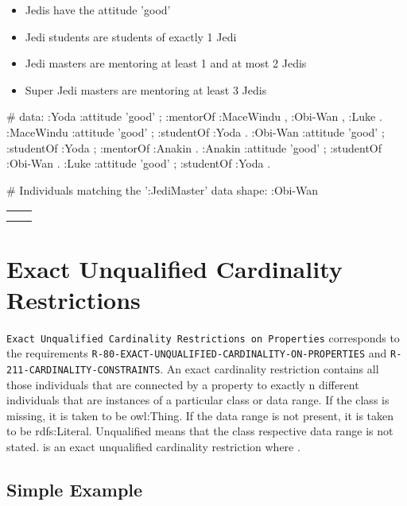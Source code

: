\documentclass{llncs}
\newcommand{\ms}[1]{\texttt{#1}}
\newenvironment{DL}{
\vspace{0cm}
	\begin{center}
  \begin{tabular}{r l}

}{
  \end{tabular}
	\end{center}
}
\begin{document}
\begin{itemize}
	\item Jedis have the attitude 'good'
	\item Jedi students are students of exactly 1 Jedi
	\item Jedi masters are mentoring at least 1 and at most 2 Jedis
	\item Super Jedi masters are mentoring at least 3 Jedis
\end{itemize}

\begin{ex}
# data:
:Yoda 
    :attitude 'good' ;
    :mentorOf :MaceWindu , :Obi-Wan , :Luke .
:MaceWindu
    :attitude 'good' ;
    :studentOf :Yoda .
:Obi-Wan 
    :attitude 'good' ;
    :studentOf :Yoda ;
    :mentorOf :Anakin .
:Anakin
    :attitude 'good' ; 
    :studentOf :Obi-Wan .
:Luke
    :attitude 'good' ;
    :studentOf :Yoda .
\end{ex}

\begin{ex}
# Individuals matching the ’:JediMaster’ data shape:
:Obi-Wan
\end{ex}


\begin{DL}
\\
 \\
\\

\end{DL}

\section{Exact Unqualified Cardinality Restrictions}

\ms{Exact Unqualified Cardinality Restrictions on Properties} corresponds to the requirements
\ms{R-80-EXACT-UNQUALIFIED-CARDINALITY-ON-PROPERTIES} and
\ms{R-211-CARDINALITY-CONSTRAINTS}.
An exact cardinality restriction contains all those individuals that are connected by a property to exactly n different individuals that are instances of a particular class or data range. 
If the class is missing, it is taken to be owl:Thing. 
If the data range is not present, it is taken to be rdfs:Literal.
Unqualified means that the class respective data range is not stated. 
 is an exact unqualified cardinality restriction where .

\subsection{Simple Example}
\end{document}
